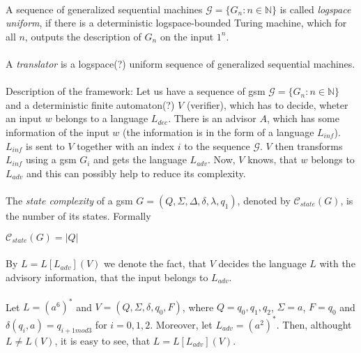 \documentclass[12pt,oneside,a4paper]{book}
\begin{document}
\paragraph{}
 A sequence of generalized sequential machines $\mathcal{G} = \{G_n:n \in \mathbb{N}\}$ is called \emph{logspace uniform}, if there is a deterministic logspace-bounded Turing machine, which for all $n$, outputs the description of $G_{n}$ on the input $1^n$.

\paragraph{}
 A \emph{translator} is a logspace(?) uniform sequence of generalized sequential machines.

\paragraph{}
Description of the framework: Let us have a sequence of gsm $\mathcal{G} = \{G_n:n \in \mathbb{N}\}$ and a deterministic finite automaton(?) $V$ (verifier), which has to decide, wheter an input $w$ belongs to a language $L_{dec}$. There is an advisor $A$, which has some information of the input $w$ (the information is in the form of a language $L_{inf}$). $L_{inf}$ is sent to $V$ together with an index $i$ to the sequence $\mathcal{G}$. $V$ then transforms $L_{inf}$ using a gsm $G_{i}$ and gets the language $L_{adv}$. Now, $V$ knows, that $w$ belongs to $L_{adv}$ and this can possibly help to reduce its complexity.

\paragraph{}
 The \emph{state complexity} of a gsm $G = (Q, \Sigma, \Delta, \delta, \lambda, q_1)$, denoted by $\mathscr{C}_{state}(G)$, is the number of its states. Formally \\
\centerline{$\mathscr{C}_{state}(G) = |Q|$}

\paragraph{}
\oznacenie By $L = L[L_{adv}](V)$ we denote the fact, that $V$ decides the language $L$ with the advisory information, that the input belongs to $L_{adv}$.

\paragraph{}
\cpriklad Let $L = (a^6)^*$ and $V = (Q, \Sigma, \delta, q_0, F)$, where $Q = {q_0, q_1, q_2}$, $\Sigma = {a}$, $F = {q_0}$ and $\delta (q_i, a) = q_{i+1 mod 3}$ for $i = 0,1,2$. Moreover, let $L_{adv} = (a^2)^*$. Then, althought $L \neq L(V)$, it is easy to see, that $L = L[L_{adv}](V)$.
\end{document}
